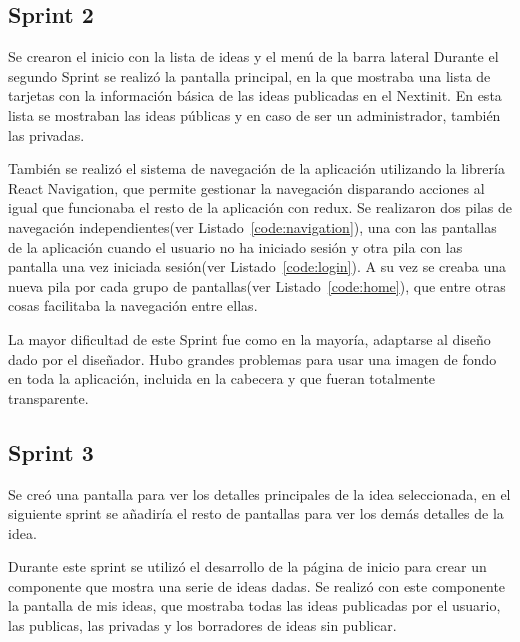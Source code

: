 \subsection{Sprint 2}

Se crearon el inicio con la lista de ideas y el menú de la barra lateral
Durante el segundo Sprint se realizó la pantalla principal, en la que mostraba una lista de tarjetas con la 
información básica de las ideas publicadas en el Nextinit. En esta lista se mostraban las ideas públicas y 
en caso de ser un administrador, también las privadas.

También se realizó el sistema de navegación de la aplicación utilizando la librería React Navigation, que permite gestionar 
la navegación disparando acciones al igual que funcionaba el resto de la aplicación con redux. Se realizaron dos 
pilas de navegación independientes(ver Listado~\ref{code:navigation}), una con las pantallas de la aplicación cuando el usuario no ha iniciado 
sesión y otra pila con las pantalla una vez iniciada sesión(ver Listado~\ref{code:login}). A su vez se creaba una nueva pila por cada grupo de pantallas(ver Listado~\ref{code:home}),
que entre otras cosas facilitaba la navegación entre ellas.





La mayor dificultad de este Sprint fue como en la mayoría, adaptarse al diseño dado por el diseñador. Hubo grandes problemas
para usar una imagen de fondo en toda la aplicación, incluida en la cabecera y que fueran totalmente transparente.

\subsection{Sprint 3}

Se creó una pantalla para ver los detalles principales de la idea seleccionada, en el siguiente sprint se añadiría el resto de pantallas 
para ver los demás detalles de la idea.

Durante este sprint se utilizó el desarrollo de la página de inicio para crear un componente que mostra una serie de ideas dadas. Se 
realizó con este componente la pantalla de mis ideas, que mostraba todas las ideas publicadas por el usuario, las publicas, las privadas y
los borradores de ideas sin publicar.

